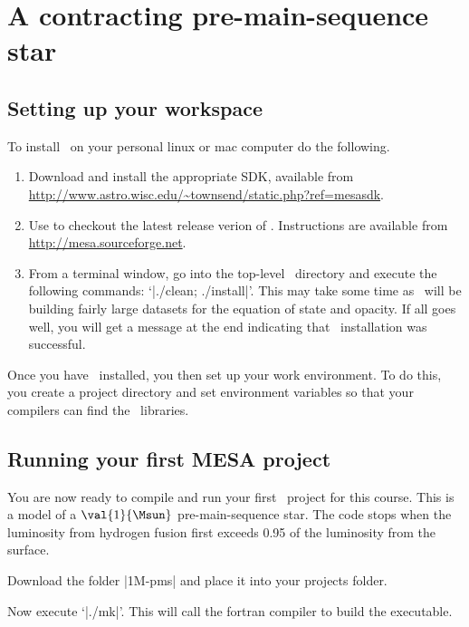 
\DefineShortVerb{\|}

\section*{ A contracting pre-main-sequence star}\label{s.MESA-contraction}

\subsection{Setting up your workspace}

To install \mesa\ on your personal linux or mac computer do the following.
\begin{enumerate}
	\item Download and install the appropriate SDK, available from \url{http://www.astro.wisc.edu/~townsend/static.php?ref=mesasdk}. 
	\item Use  to checkout the latest release verion of \MESA. Instructions are available from \url{http://mesa.sourceforge.net}.
	\item From a terminal window, go into the top-level \mesa\ directory and execute the following commands: `|./clean; ./install|'.  This may take some time as \mesa\ will be building fairly large datasets for the equation of state and opacity.  If all goes well, you will get a message at the end indicating that \mesa\ installation was successful.
\end{enumerate}

Once you have \mesa\ installed, you then set up your work environment. To do this, you create a project directory and set environment variables so that your  compilers can find the \mesa\ libraries.

\subsection{Running your first MESA project}

You are now ready to compile and run your first \mesa\ project for this course. This is a model of a $\val{1}{\Msun}$ pre-main-sequence star. The code stops when the luminosity from hydrogen fusion first exceeds 0.95 of the luminosity from the surface. 

Download the folder |1M-pms| and place it into your projects folder.

Now execute `|./mk|'. This will call the fortran compiler to build the executable. 

